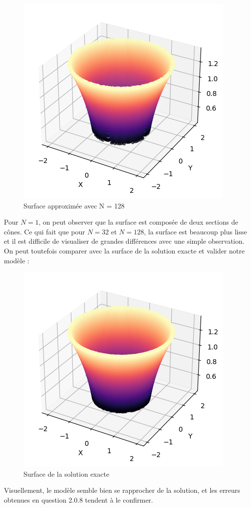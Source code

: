 \documentclass{article}
\begin{document}
{    \begin{figure}[H]
        \centering
        \includegraphics[width=0.75\linewidth]{surfaceWith128.png}
        \caption{Surface approximée avec N = 128}
        \label{fig:surface_N128}
    \end{figure}

    Pour $N=1$, on peut observer que la surface est composée de deux sections de cônes. Ce qui fait que pour $N = 32$ et $N = 128$, la surface est beaucoup plus lisse et il est difficile de visualiser de grandes différences avec une simple observation. On peut toutefois comparer avec la surface de la solution exacte et valider notre modèle :

    \begin{figure}[H]
        \centering
        \includegraphics[width=0.75\linewidth]{surfaceWithExact.png}
        \caption{Surface de la solution exacte}
        \label{fig:surface_exact}
    \end{figure}

    Visuellement, le modèle semble bien se rapprocher de la solution, et les erreurs obtenues en question 2.0.8 tendent à le confirmer.
}

\end{document}

